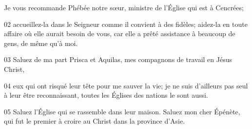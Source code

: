  Je vous recommande Phébée notre sœur, ministre de l’Église qui est à Cencrées;

02 accueillez-la dans le Seigneur comme il convient à des fidèles; aidez-la en toute affaire où elle aurait besoin de vous, car elle a prêté assistance à beaucoup de gens, de même qu’à moi.

03 Saluez de ma part Prisca et Aquilas, mes compagnons de travail en Jésus Christ,

04 eux qui ont risqué leur tête pour me sauver la vie; je ne suis d’ailleurs pas seul à leur être reconnaissant, toutes les Églises des nations le sont aussi.

05 Saluez l’Église qui se rassemble dans leur maison. Saluez mon cher Épénète, qui fut le premier à croire au Christ dans la province d’Asie.